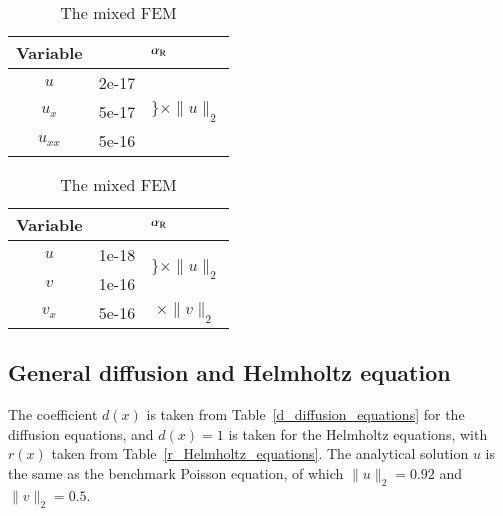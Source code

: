 \documentclass[review,3p]{elsarticle}
\begin{document}
\begin{table}[!ht]
\small
{}
\hspace{3.5cm}
\begin{subtable}{0.4\textwidth}
\caption{The standard FEM}
\label{relation_alpha_R_l2_norm_std}
\begin{tabular}{c | l c}
\hline
Variable & \multicolumn{2}{c}{$\alpha_{\rm R}$} \\ \hline
$u$ & 2e-17 & \multirow{3}{*}{$\Bigg\}\times \|u\|_2$} \\ \cline{1-2}
$u_x$ & 5e-17 & \\ \cline{1-2}
$u_{xx}$ & 5e-16 & \\ \hline
\end{tabular}
\end{subtable}
\hspace{-2cm}
\begin{subtable}{.4\textwidth}
\caption{The mixed FEM}
\label{relation_alpha_R_l2_norm_mix}
\begin{tabular}{c | l c}
\hline
Variable & \multicolumn{2}{c}{$\alpha_{\rm R}$} \\ \hline
$u$ & 1e-18 & \multirow{2}{*}{$\bigg\}\times\|u\|_2$} \\ \cline{1-2} 
$v$ & 1e-16 &  \\ \hline
$v_x$ & 5e-16 & $\times \|v\|_2$ \\ \hline
\end{tabular}
\end{subtable}
\label{relation_alpha_R_l2_norm}
\end{table}

\subsection{General diffusion and Helmholtz equation}	\label{section_d_and_r}

The coefficient $d(x)$ is taken from Table~\ref{d_diffusion_equations} for the diffusion equations, and $d(x)=1$ is taken for the Helmholtz equations, with $r(x)$ taken from Table~\ref{r_Helmholtz_equations}. The analytical solution $u$ is the same as the benchmark Poisson equation, of which $\|u\|_2=0.92$ and $\|v\|_2=0.5$. 
\end{document}
